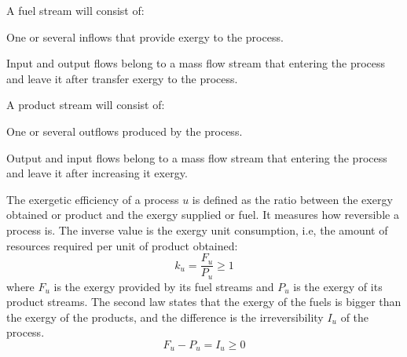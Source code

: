 \documentclass{ecos2018}
\begin{document}
A fuel stream will consist of:
\begin{elist}
	\item One or several inflows that provide exergy to the process.
	\item Input and output flows belong to a mass flow stream that entering the process and leave it after transfer exergy to the process.
\end{elist}
A product stream will consist of:
\begin{elist}
	\item One or several outflows produced by the process.
	\item Output and input flows belong to a mass flow stream that entering the process and leave it after increasing it exergy.
\end{elist}

The exergetic efficiency of a process $u$ is defined as the ratio between the exergy obtained or product and the exergy supplied or fuel. It measures how reversible a process is. The inverse value is the exergy unit consumption, i.e, the amount of resources required per unit of product obtained:
\begin{equation}
k_u=\frac{F_u}{P_u} \ge 1
\end{equation}
where $F_u$ is the exergy provided by its fuel streams and $P_u$ is the exergy of its product streams. The second law states that the exergy of the fuels is bigger than the exergy of the products, and the difference is the irreversibility $I_u$ of the process.
\begin{equation}
\label{eq:fpi}
F_u - P_u = I_u \ge 0
\end{equation}
\end{document}
